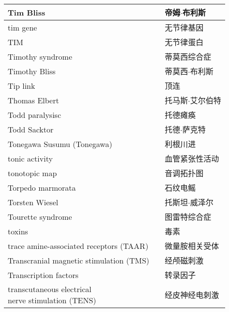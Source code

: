 \begin{longtable}{lll}
	\midrule
	Tim Bliss  && 帝姆$\cdot$布利斯  \\
	
	\midrule
	tim gene  && 无节律基因  \\
	
	\midrule
	TIM  && 无节律蛋白  \\
	
	\midrule
	Timothy syndrome  && 蒂莫西综合症  \\
	
	\midrule
	Timothy Bliss  && 蒂莫西$\cdot$布利斯  \\
	
	\midrule
	Tip link  && 顶连  \\
	
	\midrule
	Thomas Elbert   && 托马斯$\cdot$艾尔伯特  \\
	
	\midrule
	Todd paralysisc   && 托德瘫痪  \\
	
	\midrule
	Todd Sacktor   && 托德$\cdot$萨克特  \\
	
	\midrule
	Tonegawa Susumu (Tonegawa)   && 利根川进  \\
	
	\midrule
	tonic activity   && 血管紧张性活动  \\
	
	\midrule
	tonotopic map   && 音调拓扑图  \\
	
	\midrule
	Torpedo marmorata   && 石纹电鳐  \\
	
	\midrule
	Torsten Wiesel   && 托斯坦$\cdot$威泽尔  \\
	
	\midrule
	Tourette syndrome   && 图雷特综合症  \\
	
	\midrule
	toxins   && 毒素  \\
	
	\midrule
	trace amine-associated receptors (TAAR)   && 微量胺相关受体  \\
	
	\midrule
	Transcranial magnetic stimulation (TMS)   && 经颅磁刺激  \\
	
	\midrule
	Transcription factors   && 转录因子  \\
	
	\midrule
	\makecell[l]{transcutaneous electrical \\nerve stimulation (TENS)}   && 经皮神经电刺激  \\
	

\end{longtable}
